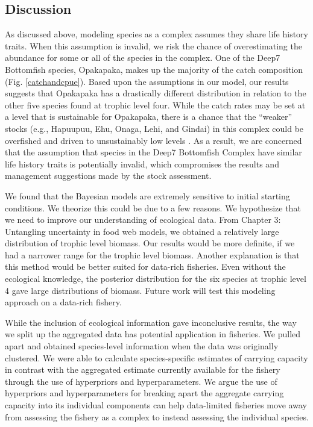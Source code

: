 \documentclass[oneside,12pt,final]{sty/ucthesis-CA2012}
\let\cite\citep                             %
\begin{document}
\begin{mainmatter}
\section*{Discussion}
As discussed above, modeling species as a complex assumes they share life history traits. When this assumption is invalid, we risk the chance of overestimating the abundance for some or all of the species in the complex. One of the Deep7 Bottomfish species, Opakapaka, makes up the majority of the catch composition (Fig. \ref{catchandcpue}). Based upon the assumptions in our model, our results suggests that Opakapaka has a drastically different distribution in relation to the other five species found at trophic level four. While the catch rates may be set at a level that is sustainable for Opakapaka, there is a chance that the ``weaker” stocks (e.g., Hapuupuu, Ehu, Onaga, Lehi, and Gindai) in this complex could be overfished and driven to unsustainably low levels \cite{hastings2017marine}. As a result, we are concerned that the assumption that species in the Deep7 Bottomfish Complex have similar life history traits is potentially invalid, which compromises the results and management suggestions made by the stock assessment.

\vspace{5mm}

We found that the Bayesian models are extremely sensitive to initial starting conditions. We theorize this could be due to a few reasons. We hypothesize that we need to improve our understanding of ecological data. From Chapter 3: Untangling uncertainty in food web models, we obtained a relatively large distribution of trophic level biomass. Our results would be more definite, if we had a narrower range for the trophic level biomass. Another explanation is that this method would be better suited for data-rich fisheries. Even without the ecological knowledge, the posterior distribution for the six species at trophic level 4 gave large distributions of biomass. Future work will test this modeling approach on a data-rich fishery.

\vspace{5mm}

While the inclusion of ecological information gave inconclusive results, the way we split up the aggregated data has potential application in fisheries. We pulled apart and obtained species-level information when the data was originally clustered. We were able to calculate species-specific estimates of carrying capacity in contrast with the aggregated estimate currently available for the fishery through the use of hyperpriors and hyperparameters. We argue the use of hyperpriors and hyperparameters for breaking apart the aggregate carrying capacity into its individual components can help data-limited fisheries move away from assessing the fishery as a complex to instead assessing the individual species. 


\end{mainmatter}
\end{document}
